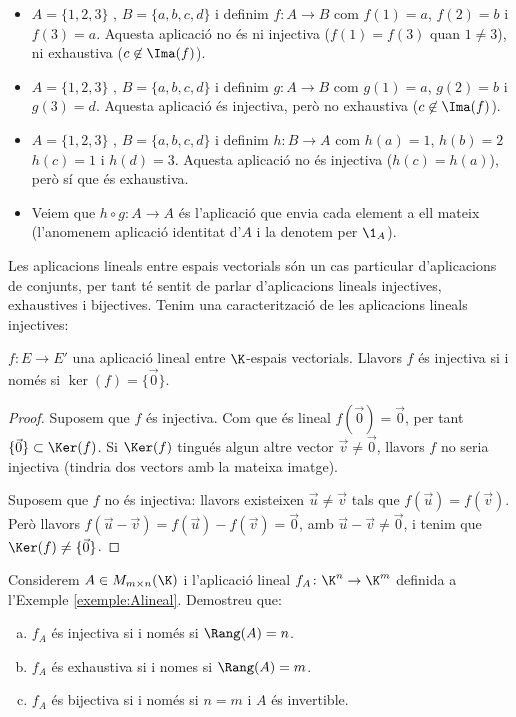 \begin{exemple}
	\begin{itemize}
		\item $A=\{1,2,3\}$ , $B=\{a,b,c,d\}$ i definim $f\colon A \to B$ com $f(1)=a$, $f(2)=b$ i $f(3)=a$. Aquesta aplicació no és ni injectiva ($f(1)=f(3)$ quan $1\neq 3$), ni exhaustiva ($c\not\in \Ima(f)$).
		\item $A=\{1,2,3\}$ , $B=\{a,b,c,d\}$ i definim $g\colon A \to B$ com $g(1)=a$, $g(2)=b$ i $g(3)=d$. Aquesta aplicació és injectiva, però no exhaustiva ($c\not\in \Ima(f)$).
		\item $A=\{1,2,3\}$ , $B=\{a,b,c,d\}$ i definim $h\colon B \to A$ com $h(a)=1$, $h(b)=2$ $h(c)=1$ i $h(d)=3$. Aquesta aplicació no és injectiva ($h(c)=h(a)$), però sí que és  exhaustiva.
		\item Veiem que $h\circ g \colon A \to A$ és l'aplicació que envia cada element a ell mateix (l'anomenem aplicació identitat d'$A$ i la denotem per $\1_A$).
	\end{itemize}
\end{exemple}

Les aplicacions lineals entre espais vectorials són un cas particular d'aplicacions de conjunts, per tant té sentit de parlar d'aplicacions lineals injectives, exhaustives i bijectives. Tenim una caracterització de les aplicacions lineals injectives:
\begin{lema}
	$f \colon E \to E'$ una aplicació lineal entre $\K$-espais vectorials. Llavors $f$ és injectiva si i només si $\ker(f)=\{\vec 0\}$.
\end{lema}
\begin{proof}
	Suposem que $f$ és injectiva. Com que és lineal $f(\vec 0)=\vec 0$, per tant $\{\vec 0\} \subset \Ker(f)$. Si $\Ker(f)$ tingués algun altre vector $\vec v \neq \vec 0$, llavors $f$ no seria injectiva (tindria dos vectors amb la mateixa imatge).
	
	Suposem que $f$ no és injectiva: llavors existeixen $\vec u \neq \vec v$ tals que $f(\vec u)=f(\vec v)$. Però llavors $f(\vec u- \vec v)=f(\vec u)-f(\vec v)=\vec 0$, amb $\vec u-\vec v\neq \vec 0$, i tenim que $\Ker(f)\neq \{\vec 0\}$.
\end{proof}

\begin{exercici}
	Considerem $A \in M_{m\times n}(\K)$ i l'aplicació lineal $f_A\colon \K^n\to \K^m$ definida a l'Exemple \ref{exemple:Alineal}. Demostreu que:
	\begin{enumerate}[(a)]
		\item $f_A$ és injectiva si i només si $\Rang(A)=n$.
		\item $f_A$ és exhaustiva si i nomes si $\Rang(A)=m$.
		\item $f_A$ és bijectiva si i només si $n=m$ i $A$ és invertible.
	\end{enumerate}
\end{exercici}


